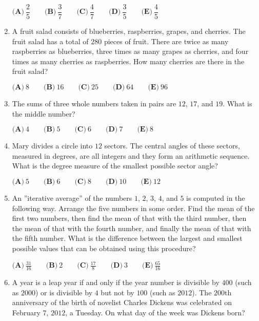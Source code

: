 \documentclass{article}
\begin{document}
\begin{enumerate}[label=\arabic*., itemsep=0.5em]
\( \textbf{(A)}\ \dfrac{2}{5}
\qquad\textbf{(B)}\ \dfrac{3}{7}
\qquad\textbf{(C)}\ \dfrac{4}{7}
\qquad\textbf{(D)}\ \dfrac{3}{5}
\qquad\textbf{(E)}\ \dfrac{4}{5}
 \)\par \vspace{0.5em}\item A fruit salad consists of blueberries, raspberries, grapes, and cherries.  The fruit salad has a total of \(280\) pieces of fruit.  There are twice as many raspberries as blueberries, three times as many grapes as cherries, and four times as many cherries as raspberries.  How many cherries are there in the fruit salad?

\( \textbf{(A)}\ 8\qquad\textbf{(B)}\ 16\qquad\textbf{(C)}\ 25\qquad\textbf{(D)}\ 64\qquad\textbf{(E)}\ 96 \)\par \vspace{0.5em}\item The sums of three whole numbers taken in pairs are \(12\), \(17\), and \(19\).  What is the middle number?

\( \textbf{(A)}\ 4\qquad\textbf{(B)}\ 5\qquad\textbf{(C)}\ 6\qquad\textbf{(D)}\ 7\qquad\textbf{(E)}\ 8 \)\par \vspace{0.5em}\item Mary divides a circle into \(12\) sectors.  The central angles of these sectors, measured in degrees, are all integers and they form an arithmetic sequence.  What is the degree measure of the smallest possible sector angle?

\( \textbf{(A)}\ 5\qquad\textbf{(B)}\ 6\qquad\textbf{(C)}\ 8\qquad\textbf{(D)}\ 10\qquad\textbf{(E)}\ 12 \)\par \vspace{0.5em}\item An ''iterative average'' of the numbers \(1\), \(2\), \(3\), \(4\), and \(5\) is computed in the following way.  Arrange the five numbers in some order.  Find the mean of the first two numbers, then find the mean of that with the third number, then the mean of that with the fourth number, and finally the mean of that with the fifth number.  What is the difference between the largest and smallest possible values that can be obtained using this procedure?

\( \textbf{(A)}\ \frac{31}{16}\qquad\textbf{(B)}\ 2\qquad\textbf{(C)}\ \frac{17}{8}\qquad\textbf{(D)}\ 3\qquad\textbf{(E)}\ \frac{65}{16} \)\par \vspace{0.5em}\item A year is a leap year if and only if the year number is divisible by \(400\) (such as \(2000\)) or is divisible by \(4\) but not by \(100\) (such as \(2012\)).  The \(200\text{th}\) anniversary of the birth of novelist Charles Dickens was celebrated on February \(7\), \(2012\), a Tuesday.  On what day of the week was Dickens born?


\end{enumerate}
\end{document}

